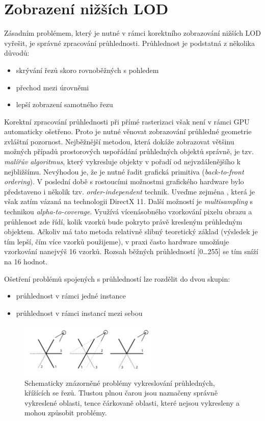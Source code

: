 \section{Zobrazení nižších LOD}
\label{sec-LODdisplay}
Zásadním problémem, který je nutné v rámci korektního zobrazování nižších LOD vyřešit, je správné zpracování průhlednosti. Průhlednost je podstatná z několika důvodů:
\begin{itemize}
\item skrývání řezů skoro rovnoběžných s pohledem
\item přechod mezi úrovněmi
\item lepší zobrazení samotného řezu
\end{itemize}
Korektní zpracování průhlednosti při přímé rasterizaci však není v rámci GPU automaticky ošetřeno. Proto je nutné věnovat zobrazování průhledné geometrie zvláštní pozornost. Nejběžnější metodou, která dokáže zobrazovat většinu možných případů prostorových uspořádání průhledných objektů správně, je tzv. \emph{malířův algoritmus}, který vykresluje objekty v pořadí od nejvzdálenějšího k nejbližšímu. Nevýhodou je, že je nutné řadit grafická primitiva (\emph{back-to-front ordering}). V poslední době s rostoucími možnostmi grafického hardware bylo představeno i několik tzv. \emph{order-independent} %
 technik. Uveďme zejména \cite{order-independent}, která je však zatím vázaná na technologii DirectX 11. Další možností je \emph{multisampling} s technikou \emph{alpha-to-coverage}. Využívá vícenásobného vzorkování pixelu obrazu a průhlenost zde řídí, kolik vzorků bude pokryto právě kresleným průhledným objektem. Ačkoliv má tato metoda relativně slibný teoretický základ (výsledek je tím lepší, čím více vzorků použijeme), v praxi často hardware umožňuje vzorkování nanejvýš 16 vzorků. Rozsah běžných průhledností [0\dots255] se tím sníží na 16 hodnot.

Ošetření problémů spojených s průhledností lze rozdělit do dvou skupin:
\begin{itemize}
\item průhlednost v rámci jedné instance
\item průhlednost v rámci instancí mezi sebou
\end{itemize}

\begin{figure}[!hbt]
\begin{center}
\includegraphics[width=0.6\textwidth]{./figures/LODtransparency.png}
\end{center}
\caption[Průhlednost trsu řezů]%
{Schematicky znázorněné problémy vykreslování průhledných, křížících se řezů. Tlustou plnou čarou jsou naznačeny správně vykreslené oblasti, tence čárkovaně oblasti, které nejsou vykresleny a mohou způsobit problémy.
\label{fig:lodSliceOrdering}
}
\end{figure}

